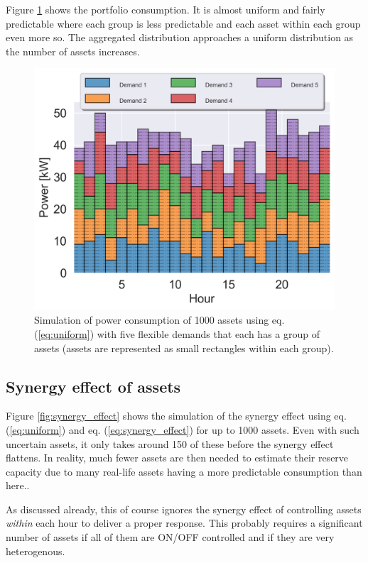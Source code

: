 \documentclass[conference]{IEEEtran}
\begin{document}
Figure \ref{fig:assets} shows the portfolio consumption. It is almost uniform and fairly predictable where each group is less predictable and each asset within each group even more so. The aggregated distribution approaches a uniform distribution as the number of assets increases.

\begin{figure}[!t]
    \centering
    \includegraphics[width=\columnwidth]{figures/assets2.png}
    \caption{Simulation of power consumption of 1000 assets using eq. (\ref{eq:uniform}) with five flexible demands that each has a group of assets (assets are represented as small rectangles within each group).}
    \label{fig:assets}
\end{figure}

\subsection{Synergy effect of assets}

Figure \ref{fig:synergy_effect} shows the simulation of the synergy effect using eq. (\ref{eq:uniform}) and
eq. (\ref{eq:synergy_effect}) for up to 1000 assets. Even with such uncertain assets, it only takes around 150 of these before the synergy effect flattens. In reality, much fewer assets are then needed to estimate their reserve capacity due to many real-life assets having a more predictable consumption than here..

As discussed already, this of course ignores the synergy effect of controlling assets \textit{within} each hour to deliver a proper response. This probably requires a significant number of assets if all of them are ON/OFF controlled and if they are very heterogenous.
\end{document}
